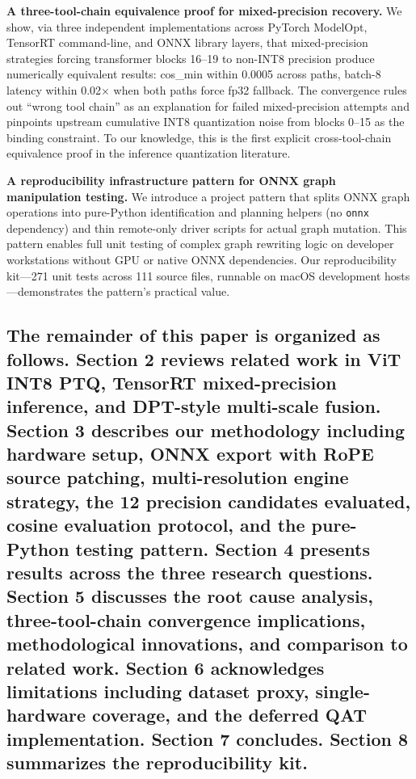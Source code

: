\documentclass[
]{article}
\begin{document}
\textbf{A three-tool-chain equivalence proof for mixed-precision
recovery.} We show, via three independent implementations across PyTorch
ModelOpt, TensorRT command-line, and ONNX library layers, that
mixed-precision strategies forcing transformer blocks 16--19 to non-INT8
precision produce numerically equivalent results: cos\_min within 0.0005
across paths, batch-8 latency within 0.02× when both paths force fp32
fallback. The convergence rules out ``wrong tool chain'' as an
explanation for failed mixed-precision attempts and pinpoints upstream
cumulative INT8 quantization noise from blocks 0--15 as the binding
constraint. To our knowledge, this is the first explicit
cross-tool-chain equivalence proof in the inference quantization
literature.

\textbf{A reproducibility infrastructure pattern for ONNX graph
manipulation testing.} We introduce a project pattern that splits ONNX
graph operations into pure-Python identification and planning helpers
(no \texttt{onnx} dependency) and thin remote-only driver scripts for
actual graph mutation. This pattern enables full unit testing of complex
graph rewriting logic on developer workstations without GPU or native
ONNX dependencies. Our reproducibility kit---271 unit tests across 111
source files, runnable on macOS development hosts---demonstrates the
pattern's practical value.

\subsection{The remainder of this paper is organized as follows. Section
2 reviews related work in ViT INT8 PTQ, TensorRT mixed-precision
inference, and DPT-style multi-scale fusion. Section 3 describes our
methodology including hardware setup, ONNX export with RoPE source
patching, multi-resolution engine strategy, the 12 precision candidates
evaluated, cosine evaluation protocol, and the pure-Python testing
pattern. Section 4 presents results across the three research questions.
Section 5 discusses the root cause analysis, three-tool-chain
convergence implications, methodological innovations, and comparison to
related work. Section 6 acknowledges limitations including dataset
proxy, single-hardware coverage, and the deferred QAT implementation.
Section 7 concludes. Section 8 summarizes the reproducibility
kit.}\label{the-remainder-of-this-paper-is-organized-as-follows.-section-2-reviews-related-work-in-vit-int8-ptq-tensorrt-mixed-precision-inference-and-dpt-style-multi-scale-fusion.-section-3-describes-our-methodology-including-hardware-setup-onnx-export-with-rope-source-patching-multi-resolution-engine-strategy-the-12-precision-candidates-evaluated-cosine-evaluation-protocol-and-the-pure-python-testing-pattern.-section-4-presents-results-across-the-three-research-questions.-section-5-discusses-the-root-cause-analysis-three-tool-chain-convergence-implications-methodological-innovations-and-comparison-to-related-work.-section-6-acknowledges-limitations-including-dataset-proxy-single-hardware-coverage-and-the-deferred-qat-implementation.-section-7-concludes.-section-8-summarizes-the-reproducibility-kit.}
\end{document}
